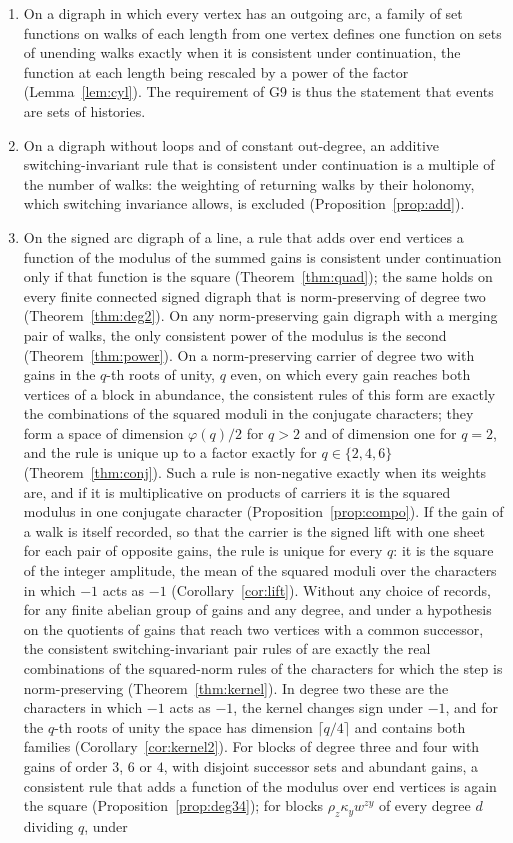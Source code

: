 \begin{enumerate}[label=(\roman*)]
\item On a digraph in which every vertex has an outgoing arc, a family of set functions on walks of each length from one vertex defines one function on sets of unending walks exactly when it is consistent under continuation, the function at each length being rescaled by a power of the factor (Lemma~\ref{lem:cyl}). The requirement of G9 is thus the statement that events are sets of histories.
\item On a digraph without loops and of constant out-degree, an additive switching-invariant rule that is consistent under continuation is a multiple of the number of walks: the weighting of returning walks by their holonomy, which switching invariance allows, is excluded (Proposition~\ref{prop:add}).
\item On the signed arc digraph of a line, a rule that adds over end vertices a function of the modulus of the summed gains is consistent under continuation only if that function is the square (Theorem~\ref{thm:quad}); the same holds on every finite connected signed digraph that is norm-preserving of degree two (Theorem~\ref{thm:deg2}). On any norm-preserving gain digraph with a merging pair of walks, the only consistent power of the modulus is the second (Theorem~\ref{thm:power}). On a norm-preserving carrier of degree two with gains in the $q$-th roots of unity, $q$ even, on which every gain reaches both vertices of a block in abundance, the consistent rules of this form are exactly the combinations of the squared moduli in the conjugate characters; they form a space of dimension $\varphi(q)/2$ for $q>2$ and of dimension one for $q=2$, and the rule is unique up to a factor exactly for $q\in\{2,4,6\}$ (Theorem~\ref{thm:conj}). Such a rule is non-negative exactly when its weights are, and if it is multiplicative on products of carriers it is the squared modulus in one conjugate character (Proposition~\ref{prop:compo}). If the gain of a walk is itself recorded, so that the carrier is the signed lift with one sheet for each pair of opposite gains, the rule is unique for every $q$: it is the square of the integer amplitude, the mean of the squared moduli over the characters in which $-1$ acts as $-1$ (Corollary~\ref{cor:lift}). Without any choice of records, for any finite abelian group of gains and any degree, and under a hypothesis on the quotients of gains that reach two vertices with a common successor, the consistent switching-invariant pair rules of \cite{g8} are exactly the real combinations of the squared-norm rules of the characters for which the step is norm-preserving (Theorem~\ref{thm:kernel}). In degree two these are the characters in which $-1$ acts as $-1$, the kernel changes sign under $-1$, and for the $q$-th roots of unity the space has dimension $\lceil q/4\rceil$ and contains both families (Corollary~\ref{cor:kernel2}). For blocks of degree three and four with gains of order $3$, $6$ or $4$, with disjoint successor sets and abundant gains, a consistent rule that adds a function of the modulus over end vertices is again the square (Proposition~\ref{prop:deg34}); for blocks $\rho_z\kappa_yw^{zy}$ of every degree $d$ dividing $q$, under 
\end{enumerate}
